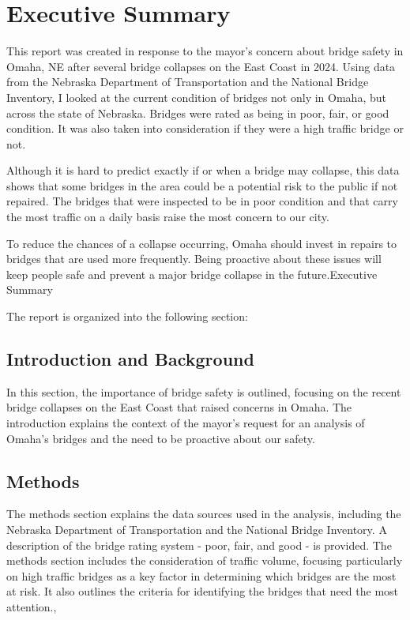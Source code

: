 \documentclass[
  letterpaper,
  DIV=11,
  numbers=noendperiod]{scrreprt}
\begin{document}

\chapter{Executive Summary}\label{executive-summary}

This report was created in response to the mayor's concern about bridge
safety in Omaha, NE after several bridge collapses on the East Coast in
2024. Using data from the Nebraska Department of Transportation and the
National Bridge Inventory, I looked at the current condition of bridges
not only in Omaha, but across the state of Nebraska. Bridges were rated
as being in poor, fair, or good condition. It was also taken into
consideration if they were a high traffic bridge or not.

Although it is hard to predict exactly if or when a bridge may collapse,
this data shows that some bridges in the area could be a potential risk
to the public if not repaired. The bridges that were inspected to be in
poor condition and that carry the most traffic on a daily basis raise
the most concern to our city.

To reduce the chances of a collapse occurring, Omaha should invest in
repairs to bridges that are used more frequently. Being proactive about
these issues will keep people safe and prevent a major bridge collapse
in the future.Executive Summary

The report is organized into the following section:

\section{Introduction and Background}\label{introduction-and-background}

In this section, the importance of bridge safety is outlined, focusing
on the recent bridge collapses on the East Coast that raised concerns in
Omaha. The introduction explains the context of the mayor's request for
an analysis of Omaha's bridges and the need to be proactive about our
safety.

\section{Methods}\label{methods}

The methods section explains the data sources used in the analysis,
including the Nebraska Department of Transportation and the National
Bridge Inventory. A description of the bridge rating system - poor,
fair, and good - is provided. The methods section includes the
consideration of traffic volume, focusing particularly on high traffic
bridges as a key factor in determining which bridges are the most at
risk. It also outlines the criteria for identifying the bridges that
need the most attention.,
\end{document}
